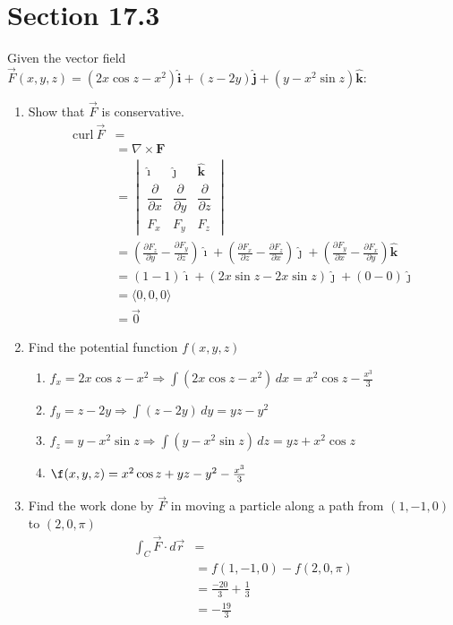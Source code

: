 \documentclass[letter,11pt]{article}
\begin{document}
\section*{Section 17.3}
Given the vector field $\vec{F}(x, y, z)=\left(2 x \cos z-x^2\right) \hat{\mathbf{i}}+(z-2 y) \hat{\mathbf{j}}+\left(y-x^2 \sin z\right) \hat{\mathbf{k}}$:
\begin{enumerate}[label = \roman*.]
    \item Show that $\vec{F}$ is conservative.
    \begin{align*}
    \mathrm{curl}~\vec{F} &= \\
    &= \nabla \times \mathbf{F} \\
    &= \begin{vmatrix} \boldsymbol{\hat\imath} & \boldsymbol{\hat\jmath} & \boldsymbol{\hat k} \\{\dfrac{\partial}{\partial x}} & {\dfrac{\partial}{\partial y}} & {\dfrac{\partial}{\partial z}} \\F_x & F_y & F_z \end{vmatrix} \\
    &= \left(\frac{\partial F_z}{\partial y} - \frac{\partial F_y}{\partial z}\right) \boldsymbol{\hat\imath} + \left(\frac{\partial F_x}{\partial z} - \frac{\partial F_z}{\partial x} \right) \boldsymbol{\hat\jmath} + \left(\frac{\partial F_y}{\partial x} - \frac{\partial F_x}{\partial y} \right) \boldsymbol{\hat k}\\
    &= (1-1)\boldsymbol{\hat\imath} + \left(2x\sin z-2x\sin z\right)\boldsymbol{\hat\jmath} + \left(0-0\right)\boldsymbol{\hat\jmath}\\
    &=\langle 0,0,0\rangle \\
    &= \vec{0}
\end{align*}
    \item Find the potential function $f(x,y,z)$
    \begin{enumerate}
        \item $f_x=2 x \cos z-x^2\Longrightarrow \int \left(2 x \cos z-x^2 \right) \, dx = x^2\cos z-\frac{x^3}{3}$
        \item $f_y=z-2 y \Longrightarrow \int \left(z-2 y \right) \, dy = yz-y^2$
        \item $f_z=y-x^2 \sin z \Longrightarrow \int \left(y-x^2 \sin z \right) \, dz = yz+x^2\cos z$
        \item $\f(x,y,z)=x^2\cos z + yz-y^2-\frac{x^3}{3}$
    \end{enumerate}
    \item Find the work done by $\vec{F}$ in moving a particle along a path from $(1, -1, 0)$ to $(2, 0, \pi)$
    \begin{align*}
        \int_{C}\vec{F}\cdot d\vec{r} &=\\
        &= f\left(1,-1,0\right)-f\left(2,0,\pi\right)\\
        &= \frac{-20}{3}+\frac{1}{3}\\
        &= \boxed{-\frac{19}{3}}
    \end{align*}
\end{enumerate}
\end{document}
